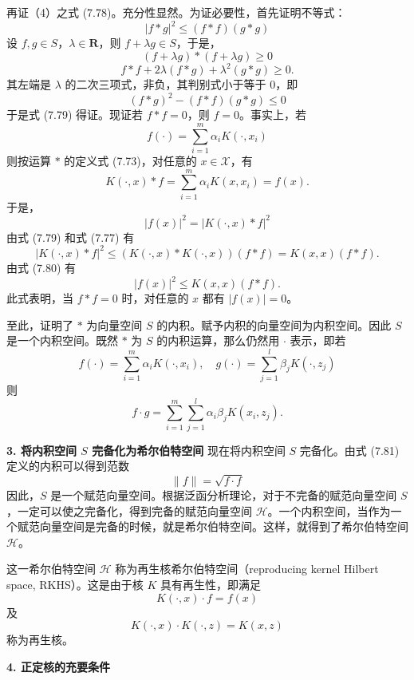 \documentclass[UTF8, 12pt, fontset=fandol, oneside]{ctexart}
\begin{document}
再证（4）之式 (7.78)。充分性显然。为证必要性，首先证明不等式：
\begin{equation}
|f*g|^2\leq (f*f)(g*g)
\tag{7.79}
\end{equation}
设 $f,g\in S$，$\lambda\in\mathbf{R}$，则 $f+\lambda g\in S$，于是，
\[
(f+\lambda g)*(f+\lambda g)\geq 0
\]
\[
f*f+2\lambda(f*g)+\lambda^2(g*g)\geq 0.
\]
其左端是 $\lambda$ 的二次三项式，非负，其判别式小于等于 0，即
\[
(f*g)^2-(f*f)(g*g)\leq 0
\]
于是式 (7.79) 得证。现证若 $f*f=0$，则 $f=0$。事实上，若
\[
f(\cdot)=\sum_{i=1}^m\alpha_iK(\cdot,x_i)
\]
则按运算 $*$ 的定义式 (7.73)，对任意的 $x\in\mathcal{X}$，有
\[
K(\cdot,x)*f=\sum_{i=1}^m\alpha_iK(x,x_i)=f(x).
\]
于是，
\begin{equation}
|f(x)|^2=|K(\cdot,x)*f|^2
\tag{7.80}
\end{equation}
由式 (7.79) 和式 (7.77) 有
\[
|K(\cdot,x)*f|^2\leq (K(\cdot,x)*K(\cdot,x))(f*f)=K(x,x)(f*f).
\]
由式 (7.80) 有
\[
|f(x)|^2\leq K(x,x)(f*f).
\]
此式表明，当 $f*f=0$ 时，对任意的 $x$ 都有 $|f(x)|=0$。

至此，证明了 $*$ 为向量空间 $S$ 的内积。赋予内积的向量空间为内积空间。因此 $S$ 是一个内积空间。既然 $*$ 为 $S$ 的内积运算，那么仍然用 $\cdot$ 表示，即若
\[
f(\cdot)=\sum_{i=1}^m\alpha_iK(\cdot,x_i),\quad g(\cdot)=\sum_{j=1}^l\beta_jK(\cdot,z_j)
\]
则
\begin{equation}
f\cdot g=\sum_{i=1}^m\sum_{j=1}^l\alpha_i\beta_jK(x_i,z_j).
\tag{7.81}
\end{equation}

\noindent\textbf{3. 将内积空间 $S$ 完备化为希尔伯特空间}\quad
现在将内积空间 $S$ 完备化。由式 (7.81) 定义的内积可以得到范数
\begin{equation}
\|f\|=\sqrt{f\cdot f}
\tag{7.82}
\end{equation}
因此，$S$ 是一个赋范向量空间。根据泛函分析理论，对于不完备的赋范向量空间 $S$，一定可以使之完备化，得到完备的赋范向量空间 $\mathcal{H}$。一个内积空间，当作为一个赋范向量空间是完备的时候，就是希尔伯特空间。这样，就得到了希尔伯特空间 $\mathcal{H}$。

这一希尔伯特空间 $\mathcal{H}$ 称为再生核希尔伯特空间（reproducing kernel Hilbert space, RKHS）。这是由于核 $K$ 具有再生性，即满足
\begin{equation}
K(\cdot,x)\cdot f=f(x)
\tag{7.83}
\end{equation}
及
\begin{equation}
K(\cdot,x)\cdot K(\cdot,z)=K(x,z)
\tag{7.84}
\end{equation}
称为再生核。

\noindent\textbf{4. 正定核的充要条件}\quad
\end{document}
